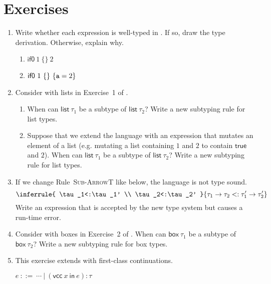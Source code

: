 \section{Exercises}

\begin{enumerate}
\item Write whether each expression is well-typed in \lang.
If so, draw the type derivation. Otherwise, explain why.
\begin{enumerate}
\item
  $\textsf{if0}\ {1}\ {\{ \}}\ {2}$
\item
  $\textsf{if0}\ {1}\ {\{ \}}\ {\{\code{a}=2\}}$
\end{enumerate}

\item Consider \plang with lists in Exercise~1 of .
  \begin{enumerate}
    \item When can $\textsf{list}\ \tau_1$ be a subtype of $\textsf{list}\
      \tau_2$? Write a new subtyping rule for list types.
    \item Suppose that we extend the language with an expression that mutates an element of
      a list (e.g. mutating a list containing $1$ and $2$ to contain
      $\textsf{true}$ and $2$).
      When can $\textsf{list}\ \tau_1$ be a subtype of $\textsf{list}\
      \tau_2$? Write a new subtyping rule for list types.
  \end{enumerate}

\item If we change Rule~\textsc{Sub-ArrowT} like below, the language is not type
  sound.
  \[
    \inferrule
    { \tau_1<:\tau_1' \\ \tau_2<:\tau_2' }
    { \tau_1\rightarrow\tau_2<:\tau_1'\rightarrow\tau_2' }
  \]
Write an expression that is accepted by the new type system but
causes a run-time error.

\item Consider \plang with boxes in Exercise~2 of .
  When can $\textsf{box}\ \tau_1$ be a subtype of $\textsf{box}\ \tau_2$?
  Write a new subtyping rule for box types.

\item This exercise extends \lang with first-class continuations.

    \vspace{0.5em}
    $e\ ::=\ \cdots\ |\ (\textsf{vcc}\ x\ \textsf{in}\ e){:}\tau$
    \vspace{0.5em}


\end{enumerate}
